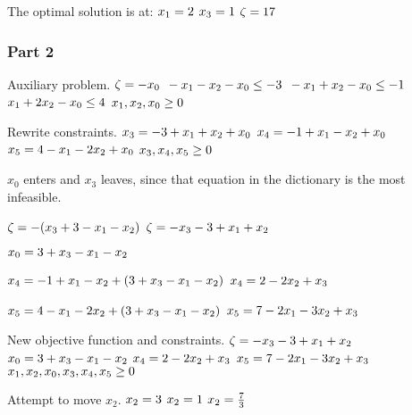 \documentclass[17pt]{extarticle}
\begin{document}
\bigskip The optimal solution is at:
$\\x_1 = 2$
$\\x_3 = 1$
$\\\zeta = 17$

\subsubsection*{Part 2}
Auxiliary problem.
$\\\zeta = -x_0$
$\\ -x_1 - x_2 - x_0 \leq -3$
$\\ -x_1 + x_2 - x_0 \leq -1$
$\\ x_1 + 2x_2 - x_0 \leq 4$
$\\ x_1, x_2, x_0 \geq 0$

\bigskip Rewrite constraints.
$\\ x_3 = - 3 + x_1 + x_2 + x_0$
$\\ x_4 = - 1 + x_1 - x_2 + x_0$
$\\ x_5 = 4 - x_1 - 2x_2 + x_0$
$\\ x_3, x_4, x_5 \geq 0$

\bigskip $x_0$ enters and $x_3$ leaves, since that equation in the dictionary is the most infeasible.

$\\\zeta = -(x_3 + 3 - x_1 - x_2)$
$\\\zeta = -x_3 - 3 + x_1 + x_2$

$\\ x_0 = 3 + x_3 - x_1 - x_2$

$\\ x_4 = - 1 + x_1 - x_2 + (3 + x_3 - x_1 - x_2)$
$\\ x_4 = 2 - 2x_2 + x_3$

$\\ x_5 = 4 - x_1 - 2x_2 + (3 + x_3 - x_1 - x_2)$
$\\ x_5 = 7 - 2x_1 - 3x_2 + x_3$

\bigskip New objective function and constraints.
$\\ \zeta = -x_3 - 3 + x_1 + x_2$
$\\ x_0 = 3 + x_3 - x_1 - x_2$
$\\ x_4 = 2 - 2x_2 + x_3$
$\\ x_5 = 7 - 2x_1 - 3x_2 + x_3$
$\\ x_1, x_2, x_0, x_3, x_4, x_5 \geq 0$

\bigskip Attempt to move $x_2$.
$\\ x_2 = 3$
$\\ x_2 = 1$
$\\ x_2 = \frac{7}{3}$
\end{document}
